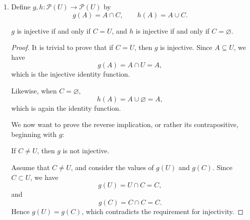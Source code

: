 \begin{enumerate}
\begin{enumerate}
\begin{proof}
                    Thus, there exists $A \in U$ such that $f_C(A) = (S, T)$. We write
                    \[ \mathrm{Range}(f_C) \supseteq \left\{(X, Y) \; \big| \; X \subseteq C \subseteq Y \subseteq U \right\}, \]
                    hence by the definition of equality,
                    \[ \mathrm{Range}(f_C) = \left\{(X, Y) \; \big| \; X \subseteq C \subseteq Y \subseteq U \right\}. \qedhere \]
                \end{proof}

                \bigskip

            \item Define $g, h: \mathcal{P}(U) \to \mathcal{P}(U)$ by
                \[ g(A) = A \cap C, \qquad h(A) = A \cup C. \]

                \begin{proposition} \label{prop:1c}
                    $g$ is injective if and only if $C = U$, and $h$ is injective if and only if $C = \varnothing$.
                \end{proposition}

                \medskip

                \begin{proof}
                    It is trivial to prove that if $C = U$, then $g$ is injective.
                    Since $A \subseteq U$, we have
                    \[ g(A) = A \cap U = A, \]
                    which is the injective identity function.

                    Likewise, when $C = \varnothing$,
                    \[ h(A) = A \cup \varnothing = A, \]
                    which is again the identity function.

                    \medskip

                    We now want to prove the reverse implication, or rather its contrapositive, beginning with $g$:
                    \begin{center}
                        If $C \neq U$, then $g$ is not injective.
                    \end{center}

                    Assume that $C \neq U$, and consider the values of $g(U)$ and $g(C)$.
                    Since $C \subset U$, we have
                    \[ g(U) = U \cap C = C, \]
                    and
                    \[ g(C) = C \cap C = C. \]
                    Hence $g(U) = g(C)$, which contradicts the requirement for injectivity.


\end{proof}
\end{enumerate}
\end{enumerate}
